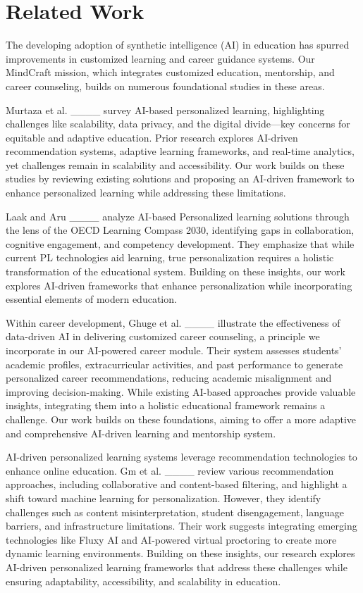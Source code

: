 \section{Related Work}
The developing adoption of synthetic intelligence (AI) in education has spurred improvements in customized learning and career guidance systems. Our MindCraft mission, which integrates customized education, mentorship, and career counseling, builds on numerous foundational studies in these areas.


Murtaza et al. ____ survey AI-based personalized learning, highlighting challenges like scalability, data privacy, and the digital divide—key concerns for equitable and adaptive education. Prior research explores AI-driven recommendation systems, adaptive learning frameworks, and real-time analytics, yet challenges remain in scalability and accessibility. Our work builds on these studies by reviewing existing solutions and proposing an AI-driven framework to enhance personalized learning while addressing these limitations.


Laak and Aru ____ analyze AI-based Personalized learning solutions through the lens of the OECD Learning Compass 2030, identifying gaps in collaboration, cognitive engagement, and competency development. They emphasize that while current PL technologies aid learning, true personalization requires a holistic transformation of the educational system. Building on these insights, our work explores AI-driven frameworks that enhance personalization while incorporating essential elements of modern education.

Within career development, Ghuge et al. ____ illustrate the effectiveness of data-driven AI in delivering customized career counseling, a principle we incorporate in our AI-powered career module. Their system assesses students' academic profiles, extracurricular activities, and past performance to generate personalized career recommendations, reducing academic misalignment and improving decision-making. While existing AI-based approaches provide valuable insights, integrating them into a holistic educational framework remains a challenge. Our work builds on these foundations, aiming to offer a more adaptive and comprehensive AI-driven learning and mentorship system.

AI-driven personalized learning systems leverage recommendation technologies to enhance online education. Gm et al. ____ review various recommendation approaches, including collaborative and content-based filtering, and highlight a shift toward machine learning for personalization. However, they identify challenges such as content misinterpretation, student disengagement, language barriers, and infrastructure limitations. Their work suggests integrating emerging technologies like Fluxy AI and AI-powered virtual proctoring to create more dynamic learning environments. Building on these insights, our research explores AI-driven personalized learning frameworks that address these challenges while ensuring adaptability, accessibility, and scalability in education.


